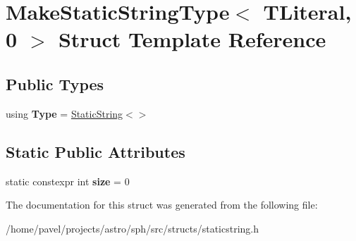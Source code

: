 \hypertarget{structMakeStaticStringType_3_01TLiteral_00_010_01_4}{}\section{Make\+Static\+String\+Type$<$ T\+Literal, 0 $>$ Struct Template Reference}
\label{structMakeStaticStringType_3_01TLiteral_00_010_01_4}
\subsection*{Public Types}
\begin{DoxyCompactItemize}
\item 
\hypertarget{structMakeStaticStringType_3_01TLiteral_00_010_01_4_a37158962799fcf44424dfe6010c47afe}{}\label{structMakeStaticStringType_3_01TLiteral_00_010_01_4_a37158962799fcf44424dfe6010c47afe} 
using {\bfseries Type} = \hyperlink{structStaticString}{Static\+String}$<$$>$
\end{DoxyCompactItemize}
\subsection*{Static Public Attributes}
\begin{DoxyCompactItemize}
\item 
\hypertarget{structMakeStaticStringType_3_01TLiteral_00_010_01_4_acc6d1d6db76fceb4692829c9a3740a37}{}\label{structMakeStaticStringType_3_01TLiteral_00_010_01_4_acc6d1d6db76fceb4692829c9a3740a37} 
static constexpr int {\bfseries size} = 0
\end{DoxyCompactItemize}


The documentation for this struct was generated from the following file\+:\begin{DoxyCompactItemize}
\item 
/home/pavel/projects/astro/sph/src/structs/staticstring.\+h\end{DoxyCompactItemize}
